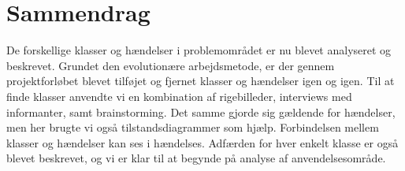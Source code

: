 \section{Sammendrag}

De forskellige klasser og hændelser i problemområdet er nu blevet analyseret og beskrevet. Grundet den evolutionære arbejdsmetode, er der gennem projektforløbet blevet tilføjet og fjernet klasser og hændelser igen og igen. Til at finde klasser anvendte vi en kombination af rigebilleder, interviews med informanter, samt brainstorming. Det samme gjorde sig gældende for hændelser, men her brugte vi også tilstandsdiagrammer som hjælp. Forbindelsen mellem klasser og hændelser kan ses i hændelses. Adfærden for hver enkelt klasse er også blevet beskrevet, og vi er klar til at begynde på analyse af anvendelsesområde. 